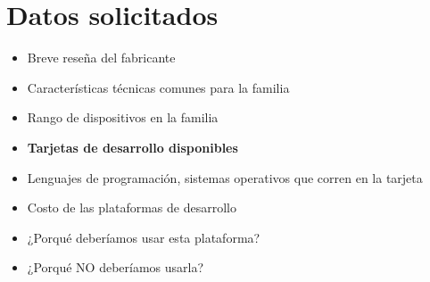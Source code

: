 \documentclass[letterpaper,10pt]{article}
\begin{document}
\section{Datos solicitados}
\begin{small}
\begin{itemize}
\item Breve reseña del fabricante
\item Características técnicas comunes para la familia
\item Rango de dispositivos en la familia
\item \textbf{Tarjetas de desarrollo disponibles}
\item Lenguajes de programación, sistemas operativos que corren en la tarjeta
\item Costo de las plataformas de desarrollo
\item ¿Porqué deberíamos usar esta plataforma?
\item ¿Porqué NO deberíamos usarla?
\end{itemize}
\end{small}
\end{document}
